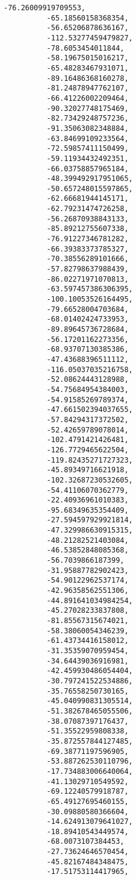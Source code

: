 \documentclass[11pt]{article}
\begin{document}
\begin{Verbatim}[commandchars=\\\{\}]
          -76.26009919709553,
          -65.18560158368354,
          -56.65206878636167,
          -112.53277459479827,
          -78.6053454011844,
          -58.19675015016217,
          -65.48283467931071,
          -89.16486368160278,
          -81.24878947762107,
          -66.41226002209464,
          -90.32027748175469,
          -82.73429248757236,
          -91.35063082348884,
          -63.84699109233564,
          -72.59857411150499,
          -59.11934432492351,
          -66.03758857965184,
          -48.399492917951065,
          -50.657248015597865,
          -62.66681944145171,
          -62.79231474726258,
          -56.26870938843133,
          -85.89212755607338,
          -76.91227346781282,
          -66.39383373785327,
          -70.38556289101666,
          -57.82798637988439,
          -86.02271971070813,
          -63.597457386306395,
          -100.10053526164495,
          -79.66528004703684,
          -68.01402424733953,
          -89.89645736728684,
          -56.17201162273356,
          -68.93707130385386,
          -47.43688396511112,
          -116.05037035216758,
          -52.08624443128988,
          -54.75684954384003,
          -54.91585269789374,
          -47.661502394037655,
          -57.84294317372502,
          -52.42659789078014,
          -102.4791421426481,
          -126.7729465622504,
          -119.82435271727323,
          -45.89349716621918,
          -102.32687230532605,
          -54.41106070362779,
          -22.40936961010383,
          -95.68349635354409,
          -27.594597929921814,
          -47.329986630915315,
          -48.21282521403084,
          -46.53852848085368,
          -56.7039866187399,
          -31.95887782902423,
          -54.90122962537174,
          -42.96358562551306,
          -44.891641034984254,
          -45.27028233837808,
          -81.85567315674021,
          -58.38060054346239,
          -61.43734416158012,
          -31.35359070959454,
          -34.64439036916981,
          -42.459930486054404,
          -30.797241522534886,
          -35.76558250730165,
          -45.040990831305514,
          -51.382678465055506,
          -38.07087397176437,
          -51.35522959808338,
          -35.872557844127485,
          -69.38771197596905,
          -53.887262530110796,
          -17.734883006640064,
          -41.13029710549592,
          -69.12240579918787,
          -65.49127695460155,
          -30.09880580366604,
          -14.624913079641027,
          -18.89410543449574,
          -68.0073107384453,
          -27.73624646570454,
          -45.82167484348475,
          -17.51753114417965,

\end{Verbatim}
\end{document}
